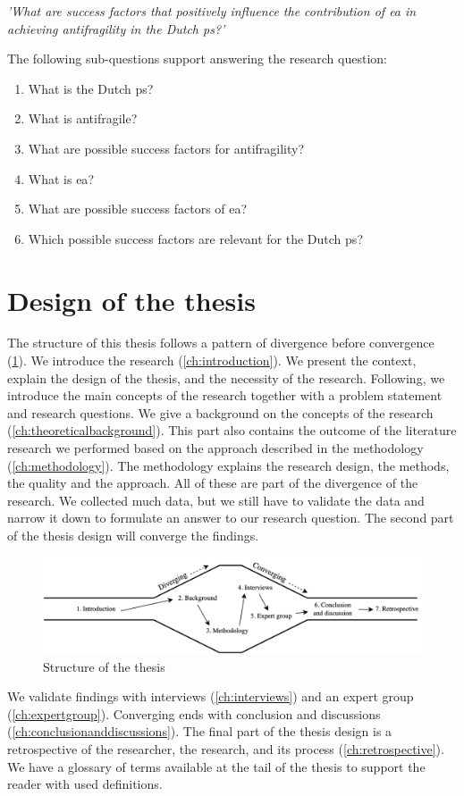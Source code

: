 \vspace{\baselineskip}
\noindent \emph{'What are success factors that positively influence the contribution of \acrlong{ea} in achieving \gls{antifragility} in the Dutch \gls{ps}?'}
\vspace{\baselineskip}

\noindent The following sub-questions support answering the research question:
\begin{enumerate}
	\item{What is the Dutch \gls{ps}?}
	\item{What is \gls{antifragile}?}
	\item{What are possible success factors for \gls{antifragility}?}
	\item{What is \acrlong{ea}?}
	\item{What are possible success factors of \acrlong{ea}?}
	\item{Which possible success factors are relevant for the Dutch \gls{ps}?}
\end{enumerate}

\section{Design of the thesis}
\label{sec:structure}
The structure of this thesis follows a pattern of divergence before convergence (\cref{fig:design}). We introduce the research (\cref{ch:introduction}). We present the context, explain the design of the thesis, and the necessity of the research. Following, we introduce the main concepts of the research together with a problem statement and research questions. We give a background on the concepts of the research (\cref{ch:theoreticalbackground}). This part also contains the outcome of the literature research we performed based on the approach described in the methodology (\cref{ch:methodology}). The methodology explains the research design, the methods, the quality and the approach. All of these are part of the divergence of the research. We collected much data, but we still have to validate the data and narrow it down to formulate an answer to our research question. The second part of the thesis design will converge the findings.
\begin{figure}[H]
	\centering
	\includegraphics[width=0.9\linewidth]{images/structure}
	\caption[Design of the thesis]{Structure of the thesis}
	\label{fig:design}
\end{figure}
We validate findings with interviews (\cref{ch:interviews}) and an expert group (\cref{ch:expertgroup}). Converging ends with  conclusion and discussions (\cref{ch:conclusionanddiscussions}). The final part of the thesis design is a retrospective of the researcher, the research, and its process (\cref{ch:retrospective}). We have a glossary of terms available at the tail of the thesis to support the reader with used definitions.
